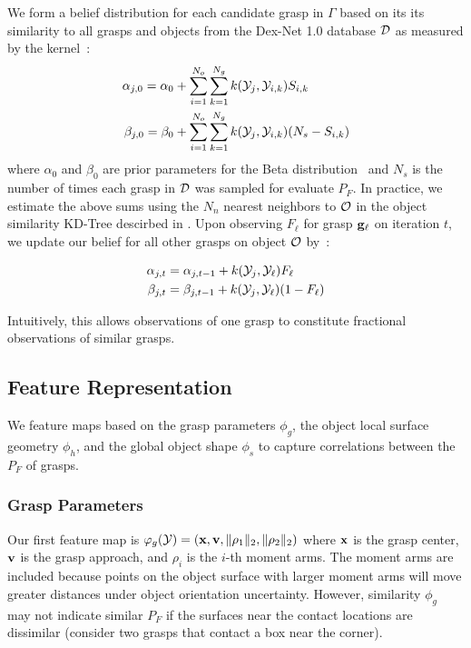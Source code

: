 We form a belief distribution for each candidate grasp in $\Gamma$ based on its its similarity to all grasps and objects from the Dex-Net 1.0 database $\mathcal{D}$ as measured by the kernel~\cite{goetschalckx2011continuous}:
\begin{align}
	\alpha_{j,0} = \alpha_{0} & + \sum \limits_{i=1}^{N_o} \sum \limits_{k=1}^{N_g} k(\mathcal{Y}_{j}, \mathcal{Y}_{i, k}) S_{i,k} \label{eq:alpha-prior} \\
	\beta_{j,0} = \beta_{0} & + \sum \limits_{i=1}^{N_o} \sum \limits_{k=1}^{N_g}  k(\mathcal{Y}_{j}, \mathcal{Y}_{i,k}) (N_s - S_{i,k}) \label{eq:beta-prior}
\end{align}
\noindent where $\alpha_{0}$ and $\beta_{0}$ are prior parameters for the Beta distribution~\cite{laskey2015bandits} and $N_s$ is the number of times each grasp in $\mathcal{D}$ was sampled for evaluate $P_F$.
In practice, we estimate the above sums using the $N_n$ nearest neighbors to $\mathcal{O}$ in the object similarity KD-Tree descirbed in .
Upon observing $F_{\ell}$ for grasp $\mathbf{g}_{\ell}$ on iteration $t$, we update our belief for all other grasps on object $\mathcal{O}$ by~\cite{goetschalckx2011continuous}:

\vspace{-2ex}
\begin{align}
	\alpha_{j,t} &= \alpha_{j,t-1} + k(\mathcal{Y}_{j}, \mathcal{Y}_{\ell}) F_{\ell} \label{eq:alpha} \\
	\beta_{j,t} &= \beta_{j,t-1} + k(\mathcal{Y}_{j}, \mathcal{Y}_{\ell}) (1 - F_{\ell})\label{eq:beta}
\end{align}

\noindent Intuitively, this allows observations of one grasp to constitute fractional observations of similar grasps.

\subsection{Feature Representation}
We feature maps based on the grasp parameters $\phi_g$, the object local surface geometry $\phi_h$, and the global object shape $\phi_s$ to capture correlations between the $P_F$ of grasps.

\subsubsection{Grasp Parameters}
Our first feature map is $\varphi_{g}(\mathcal{Y}) = (\mathbf{x}, \mathbf{v}, \| \rho_1 \|_2, \| \rho_2 \|_2)$ where $\mathbf{x}$ is the grasp center, $\mathbf{v}$ is the grasp approach, and $\rho_i$ is the $i$-th moment arms.
The moment arms are included because points on the object surface with larger moment arms will move greater distances under object orientation uncertainty.
However, similarity $\phi_g$ may not indicate similar $P_F$ if the surfaces near the contact locations are dissimilar (consider two grasps that contact a box near the corner).

